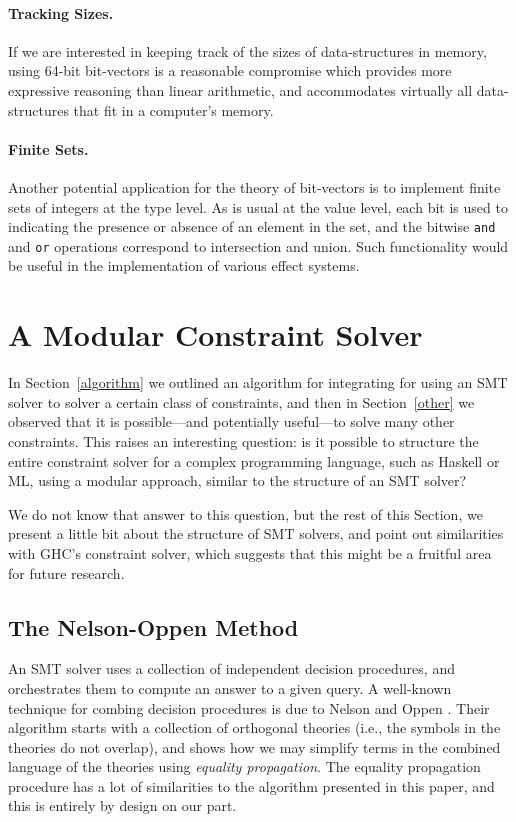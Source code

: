 \documentclass{sigplanconf}
\begin{document}
\paragraph{Tracking Sizes.}
If we are interested in keeping track of the sizes of data-structures
in memory, using 64-bit bit-vectors is a reasonable compromise
which provides more expressive reasoning than linear arithmetic,
and accommodates virtually all data-structures that fit in a computer's memory.

\paragraph{Finite Sets.}
Another potential application for the theory of bit-vectors is
to implement finite sets of integers at the type level.
As is usual at the value level, each bit is used to indicating the presence
or absence of an element in the set, and the bitwise \Verb"and"
and \Verb"or" operations correspond to intersection and union.
Such functionality would be useful in the implementation of various effect
systems.





\section{A Modular Constraint Solver}
\label{modular-typechecker}

In Section~\ref{algorithm} we outlined an algorithm for integrating for
using an SMT solver to solver a certain class of constraints, and then
in Section~\ref{other} we observed that it is possible---and potentially
useful---to solve many other constraints.  This raises an interesting
question: is it possible to structure the entire constraint solver for
a complex programming language, such as Haskell or ML, using a modular
approach, similar to the structure of an SMT solver?

We do not know that answer to this question, but the rest of this Section,
we present a little bit about the structure of SMT solvers, and point out
similarities with GHC's constraint solver, which suggests that this might
be a fruitful area for future research.

\subsection{The Nelson-Oppen Method}

An SMT solver uses a collection of independent decision procedures,
and orchestrates them to compute an answer to a given query.  A well-known
technique for combing decision procedures is due to Nelson and Oppen
\cite{NelsonOppen}.  Their algorithm starts with a collection of
orthogonal theories (i.e., the symbols in the theories do not overlap),
and shows how we may simplify terms in the combined language of the
theories using {\em equality propagation}.  The equality propagation procedure
has a lot of similarities to the algorithm presented in this paper,
and this is entirely by design on our part.
\end{document}
